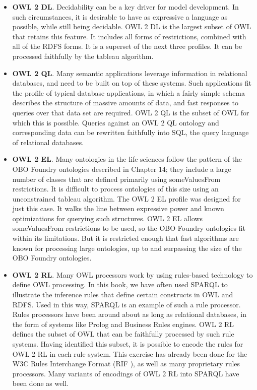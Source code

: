 \begin{itemize}
\item \textbf{OWL 2 DL}. Decidability can be a key driver for model development. In
such circumstances, it is desirable to have as expressive a language as
possible, while still being decidable. OWL 2 DL is the largest subset of
OWL that retains this feature. It includes all forms of restrictions,
combined with all of the RDFS forms. It is a superset of the next three
profiles. It can be processed faithfully by the tableau algorithm.

\item \textbf{OWL 2 QL}. Many semantic applications leverage information in relational
databases, and need to be built on top of these systems. Such
applications fit the profile of typical database applications, in which
a fairly simple schema describes the structure of massive amounts of
data, and fast responses to queries over that data set are required. OWL
2 QL is the subset of OWL for which this is possible. Queries against an
OWL 2 QL ontology and corresponding data can be rewritten faithfully
into SQL, the query language of relational databases.

\item \textbf{OWL 2 EL}. Many ontologies in the life sciences follow the pattern of the
OBO Foundry ontologies described in Chapter 14; they include a large
number of classes that are defined primarily using someValuesFrom
restrictions. It is difficult to process ontologies of this size using
an unconstrained tableau algorithm. The OWL 2 EL profile was designed
for just this case. It walks the line between expressive power and known
optimizations for querying such structures. OWL 2 EL allows
someValuesFrom restrictions to be used, so the OBO Foundry ontologies
fit within its limitations. But it is restricted enough that fast
algorithms are known for processing large ontologies, up to and
surpassing the size of the OBO Foundry ontologies.

\item \textbf{OWL 2 RL}. Many OWL processors work by using rules-based technology to
define OWL processing. In this book, we have often used SPARQL to
illustrate the inference rules that define certain constructs in OWL and
RDFS. Used in this way, SPARQL is an example of such a rule processor.
Rules processors have been around about as long as relational databases,
in the form of systems like Prolog and Business Rules engines. OWL 2 RL
defines the subset of OWL that can be faithfully processed by such rule
systems. Having identified this subset, it is possible to encode the
rules for OWL 2 RL in each rule system. This exercise has already been
done for the W3C Rules Interchange Format (RIF \cite{Kifer:13:ROE}), as well as
many proprietary rules processors. Many variants of encodings of OWL 2
RL into SPARQL have been done as well.
\end{itemize}



